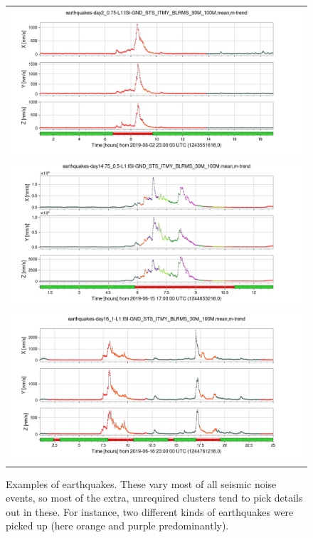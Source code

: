 \documentclass[colorlinks=true,pdfstartview=FitV,linkcolor=blue,
            citecolor=red,urlcolor=magenta]{ligodoc}
\begin{document}
\begin{figure}
  \begin{minipage}[t]{0.3\textwidth}
    \caption{Examples of earthquakes. These vary most of all seismic noise events, so most of the extra, unrequired clusters tend to pick details out in these. For instance, two different kinds of earthquakes were picked up (here orange and purple predominantly).}\label{fig:eq}
  \end{minipage}\hfill
  \begin{minipage}[c]{0.67\textwidth}
    \begin{tabular}{c}
      \includegraphics[width=\textwidth]{assets/report1/earthquakes-day2_075-L1:ISI-GND_STS_ITMY_BLRMS_30M_100Mmean,m-trend.png}\\
      \includegraphics[width=\textwidth]{assets/report1/earthquakes-day1475_05-L1:ISI-GND_STS_ITMY_BLRMS_30M_100Mmean,m-trend.png}\\
      \includegraphics[width=\textwidth]{assets/report1/earthquakes-day16_1-L1:ISI-GND_STS_ITMY_BLRMS_30M_100Mmean,m-trend.png}\\

\end{tabular}
\end{minipage}
\end{figure}
\end{document}
